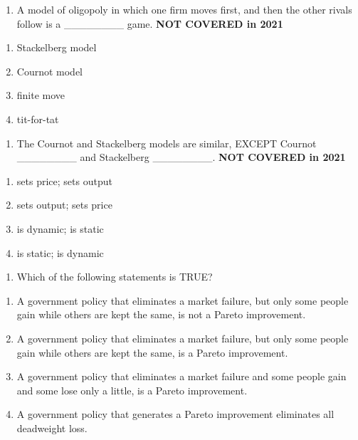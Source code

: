\documentclass[11pt,]{article}
\providecommand{\tightlist}{%
  \setlength{\itemsep}{0pt}\setlength{\parskip}{0pt}}
\begin{document}
\newpage

\begin{enumerate}
\def\labelenumi{\arabic{enumi})}
\setcounter{enumi}{5}
\tightlist
\item
  A model of oligopoly in which one firm moves first, and then the other
  rivals follow is a \_\_\_\_\_\_\_\_ game. \textbf{NOT COVERED in 2021}
\end{enumerate}

\begin{enumerate}
\def\labelenumi{\Alph{enumi})}
\tightlist
\item
  Stackelberg model
\item
  Cournot model
\item
  finite move
\item
  tit-for-tat
\end{enumerate}

\begin{enumerate}
\def\labelenumi{\arabic{enumi})}
\setcounter{enumi}{6}
\tightlist
\item
  The Cournot and Stackelberg models are similar, EXCEPT Cournot
  \_\_\_\_\_\_\_\_ and Stackelberg \_\_\_\_\_\_\_\_. \textbf{NOT COVERED in 2021}
\end{enumerate}

\begin{enumerate}
\def\labelenumi{\Alph{enumi})}
\tightlist
\item
  sets price; sets output
\item
  sets output; sets price
\item
  is dynamic; is static
\item
  is static; is dynamic
\end{enumerate}

\begin{enumerate}
\def\labelenumi{\arabic{enumi})}
\setcounter{enumi}{7}
\tightlist
\item
  Which of the following statements is TRUE?
\end{enumerate}

\begin{enumerate}
\def\labelenumi{\Alph{enumi})}
\tightlist
\item
  A government policy that eliminates a market failure, but only some
  people gain while others are kept the same, is not a Pareto
  improvement.
\item
  A government policy that eliminates a market failure, but only some
  people gain while others are kept the same, is a Pareto improvement.
\item
  A government policy that eliminates a market failure and some people
  gain and some lose only a little, is a Pareto improvement.
\item
  A government policy that generates a Pareto improvement eliminates all
  deadweight loss.
\end{enumerate}
\end{document}

